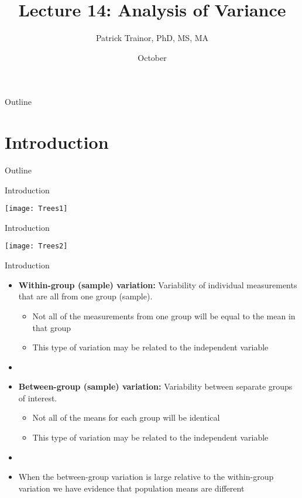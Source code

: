 \documentclass[xcolor=dvipsnames]{beamer}
\title[Lecture 14]{Lecture 14: Analysis of Variance}
\author[Patrick Trainor]{Patrick Trainor, PhD, MS, MA}
\institute[NMSU]{New Mexico State University}
\date{October}
\begin{document}
	
\begin{frame}
	\maketitle
\end{frame}

\begin{frame}{Outline}
	\tableofcontents[hideallsubsections]
\end{frame}

\section{Introduction}

\begin{frame}{Outline}
	\tableofcontents[currentsection,subsectionstyle=show/shaded/hide]
\end{frame}

\begin{frame}{Introduction}
	\begin{center}
		\texttt{[image: Trees1]}
	\end{center}
\end{frame}

\begin{frame}{Introduction}
	\begin{center}
		\texttt{[image: Trees2]}
	\end{center}
\end{frame}

\begin{frame}{Introduction}
	\begin{itemize}
		\item \textbf{Within-group (sample) variation:} Variability of individual measurements that are all from one group (sample). 
		\begin{itemize}
			\item Not all of the measurements from one group will be equal to the mean in that group
			\item This type of variation may be related to the independent variable
		\end{itemize}
		\item[]
		\item \textbf{Between-group (sample) variation:} Variability between separate groups of interest. 
		\begin{itemize}
			\item Not all of the means for each group will be identical
			\item This type of variation may be related to the independent variable
		\end{itemize}
		\item[]
		\item When the between-group variation is large relative to the within-group variation we have evidence that population means are different 
	\end{itemize}
\end{frame}
\end{document}
